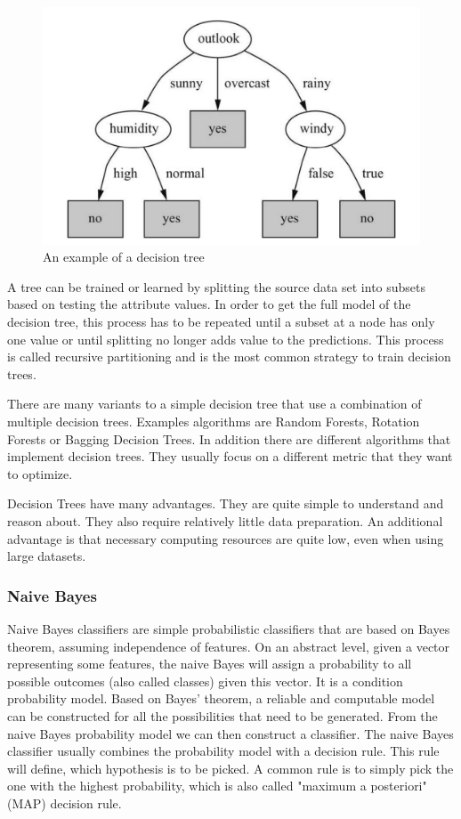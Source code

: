 \begin{figure}[!ht]
	\centering
		\includegraphics[width=1.0\textwidth]{images/decision-tree}
	\caption{An example of a decision tree \cite{WikipediaDecisionTrees}}
	\label{fig:image-decision-tree}
\end{figure}

A tree can be trained or learned by splitting the source data set into subsets based on testing the attribute values. In order to get the full model of the decision tree, this process has to be repeated until a subset at a node has only one value or until splitting no longer adds value to the predictions. This process is called recursive partitioning and is the most common strategy to train decision trees.

There are many variants to a simple decision tree that use a combination of multiple decision trees. Examples algorithms are Random Forests, Rotation Forests or Bagging Decision Trees. In addition there are different algorithms that implement decision trees. They usually focus on a different metric that they want to optimize. 

Decision Trees have many advantages. They are quite simple to understand and reason about. They also require relatively little data preparation. An additional advantage is that necessary computing resources are quite low, even when using large datasets.


\subsubsection{Naive Bayes}
Naive Bayes classifiers are simple probabilistic classifiers that are based on Bayes theorem, assuming independence of features. On an abstract level, given a vector representing some features, the naive Bayes will assign a probability to all possible outcomes (also called classes) given this vector. It is a condition probability model. Based on Bayes' theorem, a reliable and computable model can be constructed for all the possibilities that need to be generated. From the naive Bayes probability model we can then construct a classifier. The naive Bayes classifier usually combines the probability model with a decision rule. This rule will define, which hypothesis is to be picked. A common rule is to simply pick the one with the highest probability, which is also called "maximum a posteriori" (MAP) decision rule.

